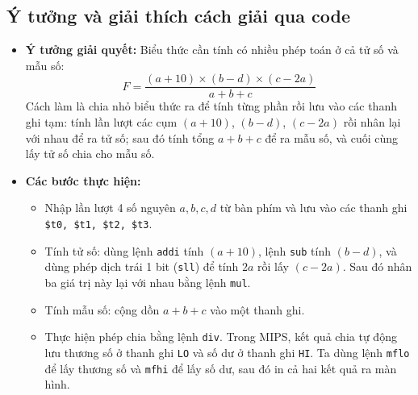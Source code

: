 \documentclass[a4paper]{article}
\numberwithin{figure}{section}
\numberwithin{table}{section}
\begin{document}
\subsection{Ý tưởng và giải thích cách giải qua code}
\begin{itemize}[leftmargin=*]
    \item \textbf{Ý tưởng giải quyết:}
    Biểu thức cần tính có nhiều phép toán ở cả tử số và mẫu số:
    \begin{equation*}
        F = \frac{(a + 10) \times (b - d) \times (c - 2a)}{a + b + c}
    \end{equation*}
    Cách làm là chia nhỏ biểu thức ra để tính từng phần rồi lưu vào các thanh ghi tạm: tính lần lượt các cụm $(a + 10)$, $(b - d)$, $(c - 2a)$ rồi nhân lại với nhau để ra tử số; sau đó tính tổng $a + b + c$ để ra mẫu số, và cuối cùng lấy tử số chia cho mẫu số.
    
    \item \textbf{Các bước thực hiện:}
    \begin{itemize}[leftmargin=*]
        \item Nhập lần lượt 4 số nguyên $a, b, c, d$ từ bàn phím và lưu vào các thanh ghi \texttt{\$t0, \$t1, \$t2, \$t3}.
        \item Tính tử số: dùng lệnh \texttt{addi} tính $(a + 10)$, lệnh \texttt{sub} tính $(b - d)$, và dùng phép dịch trái 1 bit (\texttt{sll}) để tính $2a$ rồi lấy $(c - 2a)$. Sau đó nhân ba giá trị này lại với nhau bằng lệnh \texttt{mul}.
        \item Tính mẫu số: cộng dồn $a + b + c$ vào một thanh ghi.
        \item Thực hiện phép chia bằng lệnh \texttt{div}. Trong MIPS, kết quả chia tự động lưu thương số ở thanh ghi \texttt{LO} và số dư ở thanh ghi \texttt{HI}. Ta dùng lệnh \texttt{mflo} để lấy thương số và \texttt{mfhi} để lấy số dư, sau đó in cả hai kết quả ra màn hình.
    \end{itemize}
\end{itemize}
\end{document}

